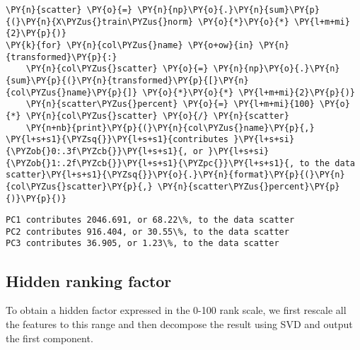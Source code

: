     \begin{tcolorbox}[breakable, size=fbox, boxrule=1pt, pad at break*=1mm,colback=cellbackground, colframe=cellborder]
\begin{Verbatim}[commandchars=\\\{\}]
\PY{n}{scatter} \PY{o}{=} \PY{n}{np}\PY{o}{.}\PY{n}{sum}\PY{p}{(}\PY{n}{X\PYZus{}train\PYZus{}norm} \PY{o}{*}\PY{o}{*} \PY{l+m+mi}{2}\PY{p}{)}
\PY{k}{for} \PY{n}{col\PYZus{}name} \PY{o+ow}{in} \PY{n}{transformed}\PY{p}{:}
    \PY{n}{col\PYZus{}scatter} \PY{o}{=} \PY{n}{np}\PY{o}{.}\PY{n}{sum}\PY{p}{(}\PY{n}{transformed}\PY{p}{[}\PY{n}{col\PYZus{}name}\PY{p}{]} \PY{o}{*}\PY{o}{*} \PY{l+m+mi}{2}\PY{p}{)}
    \PY{n}{scatter\PYZus{}percent} \PY{o}{=} \PY{l+m+mi}{100} \PY{o}{*} \PY{n}{col\PYZus{}scatter} \PY{o}{/} \PY{n}{scatter}
    \PY{n+nb}{print}\PY{p}{(}\PY{n}{col\PYZus{}name}\PY{p}{,} \PY{l+s+s1}{\PYZsq{}}\PY{l+s+s1}{contributes }\PY{l+s+si}{\PYZob{}0:.3f\PYZcb{}}\PY{l+s+s1}{, or }\PY{l+s+si}{\PYZob{}1:.2f\PYZcb{}}\PY{l+s+s1}{\PYZpc{}}\PY{l+s+s1}{, to the data scatter}\PY{l+s+s1}{\PYZsq{}}\PY{o}{.}\PY{n}{format}\PY{p}{(}\PY{n}{col\PYZus{}scatter}\PY{p}{,} \PY{n}{scatter\PYZus{}percent}\PY{p}{)}\PY{p}{)}
\end{Verbatim}
\end{tcolorbox}

    \begin{Verbatim}[commandchars=\\\{\}]
PC1 contributes 2046.691, or 68.22\%, to the data scatter
PC2 contributes 916.404, or 30.55\%, to the data scatter
PC3 contributes 36.905, or 1.23\%, to the data scatter
    \end{Verbatim}

\subsection*{Hidden ranking factor}

To obtain a hidden factor expressed in the 0-100 rank scale, we first rescale all the features to this range and then decompose the result using SVD and output the first component.

